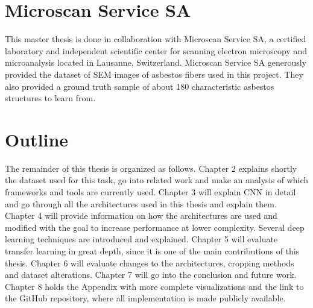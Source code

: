 \section{Microscan Service SA}

This master thesis is done in collaboration with Microscan Service SA, a certified laboratory and independent scientific center for scanning electron microscopy and microanalysis located in Lausanne, Switzerland. Microscan Service SA generously provided the dataset of SEM images of asbestos fibers used in this project. They also provided a ground truth sample of about 180 characteristic asbestos structures to learn from.

\section{Outline}

The remainder of this thesis is organized as follows. Chapter 2 explains shortly the dataset used for this task, go into related work and make an analysis of which frameworks and tools are currently used. Chapter 3 will explain CNN in detail and go through all the architectures used in this thesis and explain them. Chapter 4 will provide information on how the architectures are used and modified with the goal to increase performance at lower complexity. Several deep learning techniques are introduced and explained. Chapter 5 will evaluate transfer learning in great depth, since it is one of the main contributions of this thesis. Chapter 6 will evaluate changes to the architectures, cropping methods and dataset alterations. Chapter 7 will go into the conclusion and future work. Chapter 8 holds the Appendix with more complete visualizations and the link to the GitHub repository, where all implementation is made publicly available.\\

